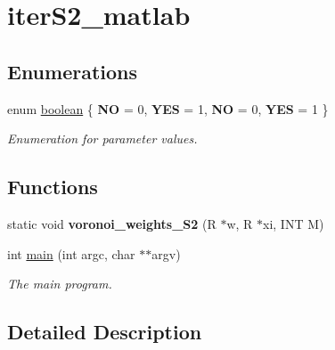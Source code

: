 \hypertarget{group__applications__iterS2__matlab}{\section{iter\-S2\-\_\-matlab}
\label{group__applications__iterS2__matlab}
}
\subsection*{Enumerations}
\begin{DoxyCompactItemize}
\item 
enum \hyperlink{group__applications__iterS2__matlab_ga7c6368b321bd9acd0149b030bb8275ed}{boolean} \{ {\bfseries N\-O} = 0, 
{\bfseries Y\-E\-S} = 1, 
{\bfseries N\-O} = 0, 
{\bfseries Y\-E\-S} = 1
 \}
\begin{DoxyCompactList}\small\item\em Enumeration for parameter values. \end{DoxyCompactList}\end{DoxyCompactItemize}
\subsection*{Functions}
\begin{DoxyCompactItemize}
\item 
\hypertarget{group__applications__iterS2__matlab_ga6df9ab68a8819563f14211cc52e36900}{static void {\bfseries voronoi\-\_\-weights\-\_\-\-S2} (R $\ast$w, R $\ast$xi, I\-N\-T M)}\label{group__applications__iterS2__matlab_ga6df9ab68a8819563f14211cc52e36900}

\item 
int \hyperlink{group__applications__iterS2__matlab_ga3c04138a5bfe5d72780bb7e82a18e627}{main} (int argc, char $\ast$$\ast$argv)
\begin{DoxyCompactList}\small\item\em The main program. \end{DoxyCompactList}\end{DoxyCompactItemize}


\subsection{Detailed Description}


